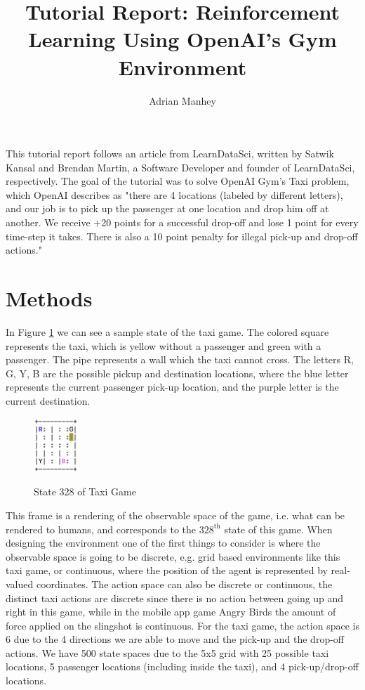\documentclass[10pt,twocolumn]{article}
\title{Tutorial Report: Reinforcement Learning Using OpenAI's Gym Environment}
\author{Adrian Manhey}
\affiliation{Occidental College}
\begin{document}
\maketitle


This tutorial \cite{tutorial} report follows an article from LearnDataSci, written by Satwik Kansal and Brendan Martin, a Software Developer and founder of LearnDataSci, respectively.
The goal of the tutorial was to solve OpenAI Gym's Taxi problem, which OpenAI describes as "there are 4 locations (labeled by different letters), and our job is to pick up the passenger at one location and drop him off at another. We receive +20 points for a successful drop-off and lose 1 point for every time-step it takes. There is also a 10 point penalty for illegal pick-up and drop-off actions." \cite{Taxi-v3}


\section{Methods}

In Figure \ref{Figure 1} we can see a sample state of the taxi game.
The colored square represents the taxi, which is yellow without a passenger and green with a passenger.
The pipe represents a wall which the taxi cannot cross.
The letters R, G, Y, B are the possible pickup and destination locations, where the blue letter represents the current passenger pick-up location, and the purple letter is the current destination.

\begin{figure}[ht]
    \caption{State 328 of Taxi Game}
    \centering
    \includegraphics[width=0.15\textwidth]{frame.png}
    \label{Figure 1}
\end{figure}

This frame is a rendering of the observable space of the game, i.e. what can be rendered to humans, and corresponds to the $328^{\text{th}}$ state of this game.
When designing the environment one of the first things to consider is where the observable space is going to be discrete, e.g. grid based environments like this taxi game, or continuous, where the position of the agent is represented by real-valued coordinates.
The action space can also be discrete or continuous, the distinct taxi actions are discrete since there is no action between going up and right in this game, while in the mobile app game Angry Birds \cite{AngryBirds} the amount of force applied on the slingshot is continuous.
For the taxi game, the action space is 6 due to the 4 directions we are able to move and the pick-up and the drop-off actions.
We have 500 state spaces due to the 5x5 grid with 25 possible taxi locations, 5 passenger locations (including inside the taxi), and 4 pick-up/drop-off locations.
\end{document}
